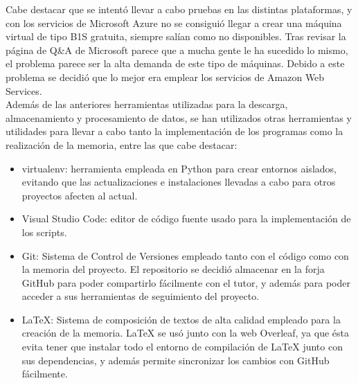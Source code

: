 Cabe destacar que se intentó llevar a cabo pruebas en las distintas plataformas, y con los servicios de Microsoft Azure no se consiguió llegar a crear una máquina virtual de tipo B1S gratuita, siempre salían como no disponibles. Tras revisar la página de Q&A de Microsoft parece que a mucha gente le ha sucedido lo mismo, el problema parece ser la alta demanda de este tipo de máquinas. Debido a este problema se decidió que lo mejor era emplear los servicios de Amazon Web Services.\\

Además de las anteriores herramientas utilizadas para la descarga, almacenamiento y procesamiento de datos, se han utilizados otras herramientas y utilidades para llevar a cabo tanto la implementación de los programas como la realización de la memoria, entre las que cabe destacar:

\begin{itemize}
    \item virtualenv: herramienta empleada en Python para crear entornos aislados, evitando que las actualizaciones e instalaciones llevadas a cabo para otros proyectos afecten al actual.
    \item Visual Studio Code: editor de código fuente usado para la implementación de los scripts.
    \item Git: Sistema de Control de Versiones empleado tanto con el código como con la memoria del proyecto. El repositorio se decidió almacenar en la forja GitHub para poder compartirlo fácilmente con el tutor, y además para poder acceder a sus herramientas de seguimiento del proyecto.
    \item \LaTeX: Sistema de composición de textos de alta calidad empleado para la creación de la memoria. LaTeX se usó junto con la web Overleaf, ya que ésta evita tener que instalar todo el entorno de compilación de LaTeX junto con sus dependencias, y además permite sincronizar los cambios con GitHub fácilmente.
\end{itemize}
